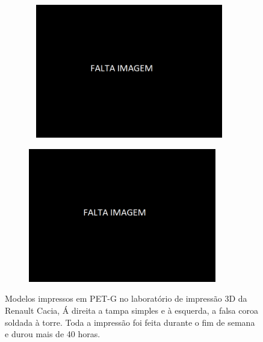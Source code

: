 \begin{figure}[htb]
    \centering
    \begin{subfigure}{.5\textwidth}\
        \centering
        \includegraphics[width = 0.9\textwidth]{Figures/Cap3/Falta_Imagem.png}
        \caption{}
        \label{fig:tampa_simples_3d}
    \end{subfigure}%
    \begin{subfigure}{.5\textwidth}
        \centering
        \includegraphics[width = 0.9\textwidth]{Figures/Cap3/Falta_Imagem.png}
        \caption{}
        \label{fig:falsa_coroa_torre_3d}
    \end{subfigure}
    \caption[Modelos dos componentes modificados impressos em PET-G.]%
    {Modelos impressos em PET-G no laboratório de impressão 3D da Renault Cacia, Á direita a tampa simples e à esquerda, a falsa coroa soldada à torre. Toda a impressão foi feita durante o fim de semana e durou mais de 40 horas.}
\end{figure}
